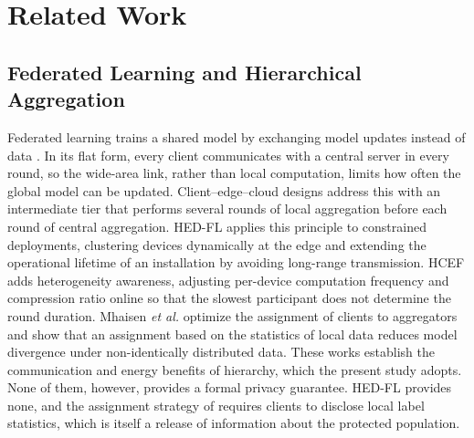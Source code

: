 %
%

\section{Related Work}
\label{sec:related}

\subsection{Federated Learning and Hierarchical Aggregation}

Federated learning trains a shared model by exchanging model updates instead
of data \cite{ref1}. In its flat form, every client communicates with a central
server in every round, so the wide-area link, rather than local computation,
limits how often the global model can be updated. Client--edge--cloud designs
\cite{ref2} address this with an intermediate tier that performs several
rounds of local aggregation before each round of central aggregation. HED-FL
\cite{ref3} applies this principle to constrained deployments, clustering
devices dynamically at the edge and extending the operational lifetime of an
installation by avoiding long-range transmission. HCEF \cite{ref4} adds
heterogeneity awareness, adjusting per-device computation frequency and
compression ratio online so that the slowest participant does not determine
the round duration. Mhaisen \emph{et al.} \cite{ref5} optimize the assignment
of clients to aggregators and show that an assignment based on the statistics
of local data reduces model divergence under non-identically distributed data.
These works establish the communication and energy benefits of hierarchy,
which the present study adopts. None of them, however, provides a formal
privacy guarantee. HED-FL provides none, and the assignment strategy of
\cite{ref5} requires clients to disclose local label statistics, which is
itself a release of information about the protected population.

